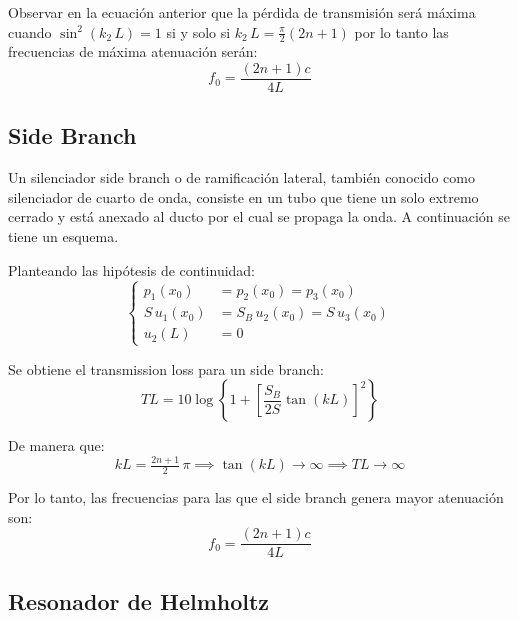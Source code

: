\documentclass[a5paper,12pt,twoside]{book}
\begin{document}
Observar en la ecuación anterior que la pérdida de transmisión será máxima cuando $\sin^2(k_2 \, L)=1$ si y solo si $k_2 \, L = \tfrac{\pi}{2} \left( 2n+1 \right)$ por lo tanto las frecuencias de máxima atenuación serán:
\begin{equation*}
    f_0 = \frac{\left( 2n+1 \right) c}{4L}
\end{equation*}


\subsection{Side Branch} 

Un silenciador side branch o de ramificación lateral, también conocido como silenciador de cuarto de onda, consiste en un tubo que tiene un solo extremo cerrado y está anexado al ducto por el cual se propaga la onda.
A continuación se tiene un esquema.

\begin{center}
    \def\svgwidth{\linewidth}
    
\end{center}

Planteando las hipótesis de continuidad:
\begin{equation*}
    \left\{
    \begin{aligned}
        p_1(x_0) &= p_2(x_0) = p_3(x_0)
        \\
        S \, u_1 (x_0) &= S_B \, u_2 (x_0) = S \, u_3 (x_0)
        \\
        u_2(L) &= 0
    \end{aligned}
    \right.
\end{equation*}

Se obtiene el transmission loss para un side branch:
\begin{equation*}
    TL = 10 \log \left\{ 1 + \left[ \frac{S_B}{2S} \tan (kL) \right]^2 \right\}
\end{equation*}

De manera que:
\begin{equation*}
    kL = \tfrac{2n+1}{2} \, \pi \implies \tan (kL) \to \infty \implies TL\to\infty
\end{equation*}

Por lo tanto, las frecuencias para las que el side branch genera mayor atenuación son:
\begin{equation*}
    f_0 = \frac{\left( 2n+1 \right) c}{4L}
\end{equation*}


\subsection{Resonador de Helmholtz}
\end{document}
